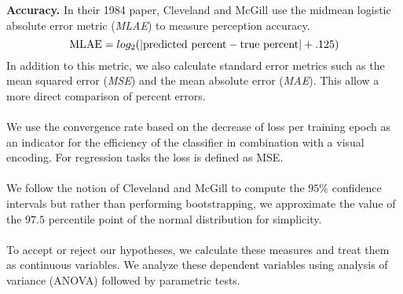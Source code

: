 \textbf{Accuracy.} In their 1984 paper, Cleveland and McGill use the midmean logistic absolute error metric (\emph{MLAE}) to measure perception accuracy.
\begin{equation}
	\textnormal{MLAE} = log_2( | \textnormal{predicted percent} - \textnormal{true percent} | + .125)
\end{equation}
In addition to this metric, we also calculate standard error metrics such as the mean squared error (\emph{MSE}) and the mean absolute error (\emph{MAE}). This allow a more direct comparison of percent errors.
\\~\\
 We use the convergence rate based on the decrease of loss per training epoch as an indicator for the efficiency of the classifier in combination with a visual encoding. For regression tasks the loss is defined as MSE.%
\\~\\
 We follow the notion of Cleveland and McGill to compute the $95\%$ confidence intervals but rather than performing bootstrapping, we approximate the value of the $97.5$ percentile point of the normal distribution for simplicity.
\\~\\
 To accept or reject our hypotheses, we calculate these measures and treat them as continuous variables. We analyze these dependent variables using analysis of variance (ANOVA) followed by parametric tests.

